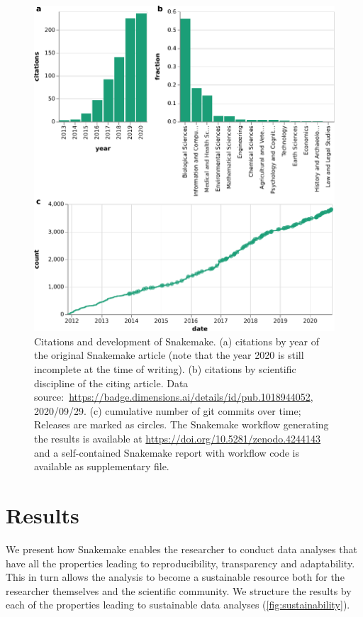 \documentclass[10pt,a4paper,twocolumn]{article}
\let\plainurl\url
\renewcommand{\url}[1]{\protect\plainurl{#1}}
\begin{document}
\begin{figure}
    \centering
	\includegraphics[width=\columnwidth]{citations+development.pdf}
	\caption{
		Citations and development of Snakemake.
		(a) citations by year of the original Snakemake article (note that the year 2020 is still incomplete at the time of writing).
		(b) citations by scientific discipline of the citing article.
		Data source:~\url{https://badge.dimensions.ai/details/id/pub.1018944052}, 2020/09/29.
		(c) cumulative number of git commits over time; Releases are marked as circles.
		The Snakemake workflow generating the results is available at \url{https://doi.org/10.5281/zenodo.4244143} and a self-contained Snakemake report with workflow code is available as supplementary file.
	}
	\label{fig:citations}
\end{figure}

\section{Results}

We present how Snakemake enables the researcher to conduct data analyses that have all the properties leading to reproducibility, transparency and adaptability. This in turn allows the analysis to become a sustainable resource both for the researcher themselves and the scientific community. 
We structure the results by each of the properties leading to sustainable data analyses (\autoref{fig:sustainability}).
\end{document}
